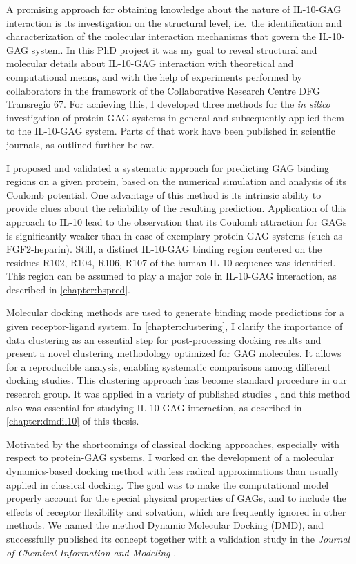 A promising approach for obtaining knowledge about the nature of IL-10-GAG
interaction is its investigation on the structural level, i.e.\ the
identification and characterization of the molecular interaction mechanisms that
govern the IL-10-GAG system. In this PhD project it was my goal to reveal
structural and molecular details about IL-10-GAG interaction with theoretical
and computational means, and with the help of experiments performed by
collaborators in the framework of the Collaborative Research Centre DFG
Transregio 67. For achieving this, I developed three methods for the
\textit{in silico} investigation of protein-GAG systems in general and
subsequently applied them to the IL-10-GAG system. Parts of that work have been
published in scientfic journals, as outlined further below.

I proposed and validated a systematic approach for predicting GAG binding
regions on a given protein, based on the numerical simulation and analysis of
its Coulomb potential. One advantage of this method is its intrinsic ability to
provide clues about the reliability of the resulting prediction. Application of
this approach to IL-10 lead to the observation that its Coulomb attraction for
GAGs is significantly weaker than in case of exemplary protein-GAG systems (such
as FGF2-heparin). Still, a distinct IL-10-GAG binding region centered on the
residues R102, R104, R106, R107 of the human IL-10 sequence was identified. This
region can be assumed to play a major role in IL-10-GAG interaction, as
described in \cref{chapter:bspred}.

Molecular docking methods are used to generate binding mode predictions for a
given receptor-ligand system. In \cref{chapter:clustering}, I clarify the
importance of data clustering as an essential step for post-processing docking
results and present a novel clustering methodology optimized for GAG molecules.
It allows for a reproducible analysis, enabling systematic comparisons among
different docking studies. This clustering approach has become standard
procedure in our research group. It was applied in a variety of published
studies \cite{franz_cathepsin_2013, hintze_sergey_2014, Samsonov_rings_cr_2013,
SalbachHirsch20137653, vanderSmissen2013}, and this method also was essential
for studying IL-10-GAG interaction, as described in \cref{chapter:dmdil10} of
this thesis.

Motivated by the shortcomings of classical docking approaches, especially with
respect to protein-GAG systems, I worked on the development of a molecular
dynamics-based docking method with less radical approximations than usually
applied in classical docking. The goal was to make the computational model
properly account for the special physical properties of GAGs, and to include the
effects of receptor flexibility and solvation, which are frequently ignored in
other methods. We named the method Dynamic Molecular Docking (DMD), and
successfully published its concept together with a validation study in the
\textit{Journal of Chemical Information and Modeling}
\cite{dmd_samsonov_gehrcke_2014}.

